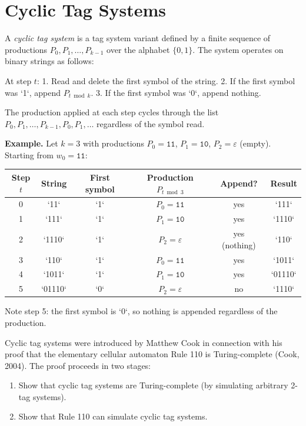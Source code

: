 \section{Cyclic Tag Systems}

\begin{definition}
A \textit{cyclic tag system} is a tag system variant defined by a finite sequence of productions $P_0, P_1, \ldots, P_{k-1}$ over the alphabet $\{ 0, 1\} $. The system operates on binary strings as follows:

At step $t$:
1. Read and delete the first symbol of the string.
2. If the first symbol was `1`, append $P_{t \bmod k}$.
3. If the first symbol was `0`, append nothing.

The production applied at each step cycles through the list $P_0, P_1, \ldots, P_{k-1}, P_0, P_1, \ldots$ regardless of the symbol read.
\end{definition}

\textbf{Example.} Let $k = 3$ with productions $P_0 = \texttt{11}$, $P_1 = \texttt{10}$, $P_2 = \varepsilon$ (empty). Starting from $w_0 = \texttt{11}$:

\begin{center}
\begin{tabular}{cccccc}
\toprule
Step $t$ & String & First symbol & Production $P_{t \bmod 3}$ & Append? & Result \\
\midrule
0 & `11` & `1` & $P_0 = \texttt{11}$ & yes & `111` \\
1 & `111` & `1` & $P_1 = \texttt{10}$ & yes & `1110` \\
2 & `1110` & `1` & $P_2 = \varepsilon$ & yes (nothing) & `110` \\
3 & `110` & `1` & $P_0 = \texttt{11}$ & yes & `1011` \\
4 & `1011` & `1` & $P_1 = \texttt{10}$ & yes & `01110` \\
5 & `01110` & `0` & $P_2 = \varepsilon$ & no & `1110` \\
\bottomrule
\end{tabular}
\end{center}

Note step 5: the first symbol is `0`, so nothing is appended regardless of the production.

Cyclic tag systems were introduced by Matthew Cook in connection with his proof that the elementary cellular automaton Rule 110 is Turing-complete (Cook, 2004). The proof proceeds in two stages:

\begin{enumerate}
\item Show that cyclic tag systems are Turing-complete (by simulating arbitrary 2-tag systems).
\item Show that Rule 110 can simulate cyclic tag systems.
\end{enumerate}

